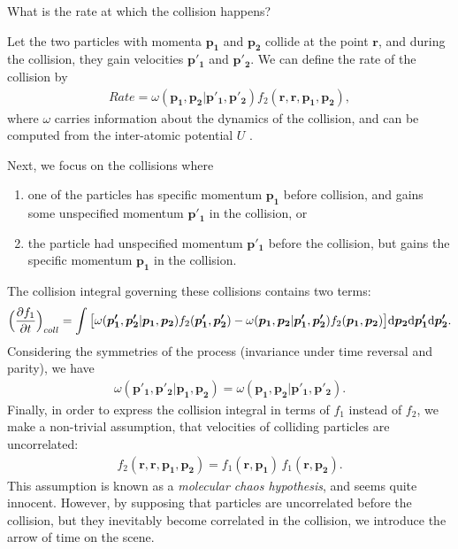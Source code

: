 What is the rate at which the collision happens?

Let the two particles with momenta $\bm{p_1}$ and $\bm{p_2}$ collide at the point $\bm{r}$, and during the collision, they gain velocities $\bm{p'_1}$ and $\bm{p'_2}$.
We can define the rate of the collision by
\begin{align*}
Rate = \omega(\bm{p_1},\bm{p_2} | \bm{p'_1}, \bm{p'_2}) f_2(\bm{r},\bm{r},\bm{p_1},\bm{p_2}),
\end{align*}
where $\omega$ carries information about the dynamics of the collision, and can be computed from the inter-atomic potential $U$ \cite{tong}.

Next, we focus on the collisions where
\begin{enumerate}
\item one of the particles has specific momentum $\bm{p_1}$ before collision, and gains some unspecified momentum $\bm{p'_1}$ in the collision, or
\item the particle had unspecified momentum $\bm{p'_1}$ before the collision, but gains the specific momentum $\bm{p_1}$ in the collision.
\end{enumerate}
The collision integral governing these collisions contains two terms:
\begin{align*}
\Big( \frac{\partial f_1}{\partial t} \Big)_{coll}= \int \big[ \omega(\bm{p'_1},\bm{p'_2} | \bm{p_1}, \bm{p_2}) f_2(\bm{p'_1},\bm{p'_2}) - \omega(\bm{p_1},\bm{p_2} | \bm{p'_1}, \bm{p'_2}) f_2(\bm{p_1}, \bm{p_2}) \big] \mathrm{d} \bm{p_2} \mathrm{d} \bm{p'_1} \mathrm{d} \bm{p'_2}.
\end{align*}
Considering the symmetries of the process (invariance under time reversal and parity), we have
\begin{align} \label{symm} 
\omega(\bm{p'_1},\bm{p'_2} | \bm{p_1}, \bm{p_2}) = \omega(\bm{p_1},\bm{p_2} | \bm{p'_1}, \bm{p'_2}).
\end{align}
Finally, in order to express the collision integral in terms of $f_1$ instead of $f_2$, we make a non-trivial assumption, that velocities of colliding particles are uncorrelated:
\begin{align} \label{chaos}
f_2(\bm{r},\bm{r},\bm{p_1},\bm{p_2}) = f_1(\bm{r},\bm{p_1})\,f_1(\bm{r},\bm{p_2}).
\end{align}
This assumption is known as a \textit{molecular chaos hypothesis}, and seems quite innocent. However, by supposing that particles are uncorrelated before the collision, but they inevitably become correlated in the collision, we introduce the arrow of time on the scene.

